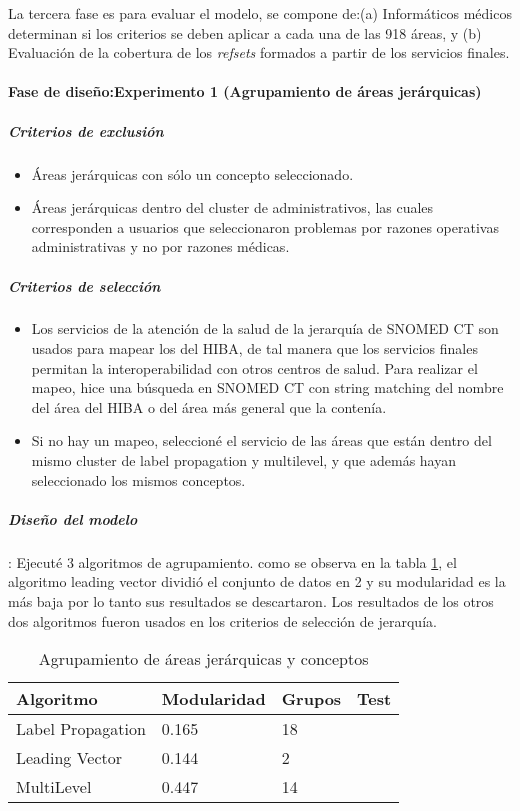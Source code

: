 La tercera fase es para evaluar el modelo, se compone de:(a) Informáticos médicos determinan si los criterios se deben aplicar a cada una de las 918 áreas, y (b) Evaluación de la cobertura de los \textit{refsets} formados a partir de los servicios finales.

\paragraph{Fase de diseño:Experimento 1 (Agrupamiento de áreas jerárquicas)}

\subparagraph{Criterios de exclusión}

\begin{itemize}
\item Áreas jerárquicas con sólo un concepto seleccionado.
\item Áreas jerárquicas dentro del cluster de administrativos, las cuales corresponden a usuarios que seleccionaron problemas por razones operativas administrativas y no por razones médicas.
\end{itemize}

\subparagraph{Criterios de selección}
\begin{itemize}
\item Los servicios de la atención de la salud de la jerarquía de SNOMED CT son usados para mapear los del HIBA, de tal manera que los servicios finales permitan la interoperabilidad con otros centros de salud. Para realizar el mapeo, hice una búsqueda en SNOMED CT con string matching del nombre del área del HIBA o del área más general que la contenía.
\item Si no hay un mapeo, seleccioné el servicio de las áreas que están dentro del mismo cluster de label propagation y multilevel, y que además hayan seleccionado los mismos conceptos.
\end{itemize}

\subparagraph{Diseño del modelo}: Ejecuté 3 algoritmos de agrupamiento. como se observa en la tabla \ref{clusteringAreas}, el algoritmo leading vector dividió el conjunto de datos en 2 y su modularidad es la más baja por lo tanto sus resultados se descartaron.  Los resultados de los otros dos algoritmos fueron usados en los criterios de selección de jerarquía.

\begin{table}[htb]
\centering
\caption{Agrupamiento de áreas jerárquicas y conceptos}
\label{clusteringAreas}
\begin{tabular}{@{}llll@{}}
\toprule
Algoritmo         & Modularidad & Grupos & Test \\ \midrule
Label Propagation & 0.165       & 18     &      \\
Leading Vector    & 0.144       & 2      &      \\
MultiLevel        & 0.447       & 14     &      \\ \bottomrule
\end{tabular}
\end{table}

